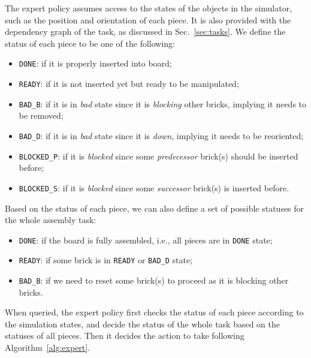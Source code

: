 The expert policy assumes access to the states of the objects in the simulator, such as the position and orientation of each piece. It is also provided with the dependency graph of the task, as discussed in Sec.~\ref{sec:tasks}. We define the status of each piece to be one of the following:
\vspace{-10pt}
\begin{itemize}
    \setlength{\topsep}{0pt}     %
    \setlength{\partopsep}{0pt}  %
    \setlength{\itemsep}{0pt}    %
    \setlength{\parskip}{0pt}
    \item {\tt DONE}: if it is properly inserted into board;
    \item {\tt READY}: if it is not inserted yet but ready to be manipulated; 
    \item {\tt BAD\_B}: if it is in {\em{bad}} state since it is {\em{blocking}} other bricks, implying it needs to be removed;
    \item {\tt BAD\_D}: if it is in {\em{bad}} state since it is {\em{down}}, implying it needs to be reoriented;
    \item {\tt BLOCKED\_P}: if it is {\em{blocked}} since some {\em{predecessor}} brick(s) should be inserted before;
    \item {\tt BLOCKED\_S}: if it is {\em{blocked}} since some {\em{successor}} brick(s) is inserted before.
\end{itemize}
\vspace{-10pt}
Based on the status of each piece, we can also define a set of possible statuses for the whole assembly task:
\vspace{-10pt}
\begin{itemize}
    \setlength{\topsep}{0pt}     %
    \setlength{\partopsep}{0pt}  %
    \setlength{\itemsep}{0pt}    %
    \setlength{\parskip}{0pt}
    \item {\tt DONE}: if the board is fully assembled, i.e., all pieces are in {\tt DONE} state;
    \item {\tt READY}: if some brick is in {\tt READY} or {\tt BAD\_D} state;
    \item {\tt BAD\_B}: if we need to reset some brick(s) to proceed as it is blocking other bricks.
\end{itemize}
\vspace{-10pt}
When queried, the expert policy first checks the status of each piece according to the simulation states, and decide the status of the whole task based on the statuses of all pieces. Then it decides the action to take following Algorithm~\ref{alg:expert}.

